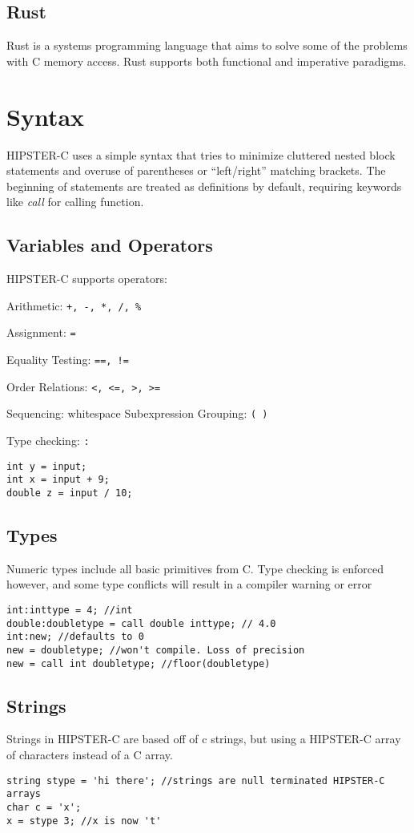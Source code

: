 \documentclass{article}
\begin{document}
\subsection{Rust}
Rust is a systems programming language that aims to solve some of the problems with C memory access. Rust supports both functional and imperative paradigms.




\section{Syntax}
HIPSTER-C uses a simple syntax that tries to minimize cluttered nested block statements and overuse of parentheses or ``left/right'' matching brackets. The beginning of statements are treated as definitions by default, requiring keywords like \textit{call} for calling function.  


\subsection{Variables and Operators}
HIPSTER-C supports operators:\par
Arithmetic: \texttt{+, -, *, /, \%}\par 
Assignment: \texttt{=}\par
Equality Testing: \texttt{==, !=}\par
Order Relations: \texttt{<, <=, >, >=}\par
Sequencing: whitespace
Subexpression Grouping: \texttt{( )}\par
Type checking: \texttt{:}


\begin{verbatim}
int y = input;
int x = input + 9;
double z = input / 10;
\end{verbatim}


\subsection{Types}
Numeric types include all basic primitives from C. Type checking is enforced however, and some type conflicts will result in a compiler warning or error
\begin{verbatim}
int:inttype = 4; //int
double:doubletype = call double inttype; // 4.0 
int:new; //defaults to 0 
new = doubletype; //won't compile. Loss of precision
new = call int doubletype; //floor(doubletype) 
\end{verbatim}


\subsection{Strings}
Strings in HIPSTER-C are based off of c strings, but using a HIPSTER-C array of characters instead of a C array. 
\begin{verbatim}
string stype = 'hi there'; //strings are null terminated HIPSTER-C arrays
char c = 'x';
x = stype 3; //x is now 't'
\end{verbatim}
\end{document}
